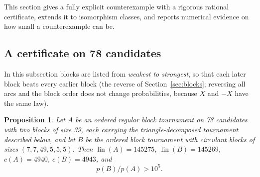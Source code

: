 \documentclass[11pt,a4paper]{article}
\newtheorem{proposition}[theorem]{Proposition}
\theoremstyle{definition}
\DeclareMathOperator{\lin}{lin}
\begin{document}
This section gives a fully explicit counterexample with a rigorous rational certificate, extends it to isomorphism classes, and reports numerical evidence on how small a counterexample can be.

\subsection{A certificate on 78 candidates}

In this subsection blocks are listed from \emph{weakest to strongest}, so that each later block beats every earlier block (the reverse of Section~\ref{sec:blocks}; reversing all arcs and the block order does not change probabilities, because $X$ and $-X$ have the same law).

\begin{proposition}\label{prop:78}
Let $A$ be an ordered regular block tournament on 78 candidates with two blocks of size 39, each carrying the triangle-decomposed tournament described below, and let $B$ be the ordered block tournament with circulant blocks of sizes $(7,7,49,5,5,5)$. Then $\lin(A)=145275$, $\lin(B)=145269$, $c(A)=4940$, $c(B)=4943$, and
\[
 p(B)/p(A)>10^5 .
\]
\end{proposition}
\end{document}
